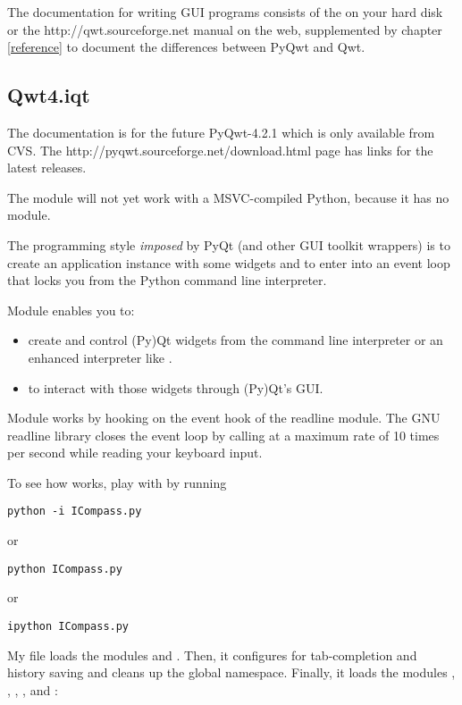 \documentclass{manual}
\newcommand{\Qwt}{\ulink{Qwt}
  {http://qwt.sourceforge.net}}
\newcommand{\Download}{\ulink{download}
  {http://pyqwt.sourceforge.net/download.html}}
\newcommand{\Future}{
  \begin{notice}[warning]
    The documentation is for the future PyQwt-4.2.1 which is only available
    from CVS. The \Download{} page has links for the latest releases.
  \end{notice}
}
\begin{document}
The documentation for writing GUI programs consists of the
 on your hard disk or the \Qwt{} manual on
the web, supplemented by chapter \ref{reference} to document the differences
between PyQwt and Qwt.


\subsection{Qwt4.iqt
  \label{iqt-intro}}

\Future{}

\begin{notice}[warning]
  The module  will not yet work with a MSVC-compiled Python,
  because it has no  module.
\end{notice}

The programming style \emph{imposed} by PyQt (and other GUI toolkit wrappers)
is to create an application instance with some widgets and to enter into an
event loop that locks you from the Python command line interpreter.

Module  enables you to:
\begin{itemize}
\item
  create and control (Py)Qt widgets from the command line interpreter or an
  enhanced interpreter like .
\item
  to interact with those widgets through (Py)Qt's GUI.
\end{itemize}

Module  works by hooking  on
the event hook of the readline module.
The GNU readline library closes the event loop by calling 
 at a maximum rate of 10 times per second
while reading your keyboard input.

To see how  works, play with  by running
\begin{verbatim}
python -i ICompass.py
\end{verbatim}
or
\begin{verbatim}
python ICompass.py
\end{verbatim}
or
\begin{verbatim}
ipython ICompass.py
\end{verbatim}

My  file loads the modules  and
.  Then, it configures  for tab-completion
and history saving and cleans up the global namespace.
Finally, it loads the modules , , ,
,  and :

\end{document}
